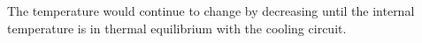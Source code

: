 The temperature would continue to change by decreasing until the internal temperature is in thermal equilibrium with the cooling circuit.